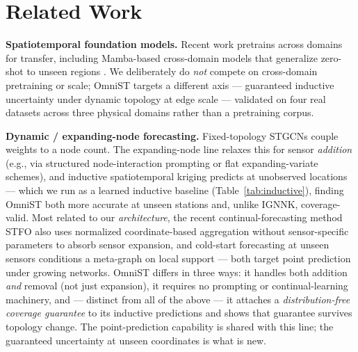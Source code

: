 \documentclass[journal]{IEEEtran}
\begin{document}
\section{Related Work}
\label{sec:related}

\textbf{Spatiotemporal foundation models.} Recent work pretrains across domains for transfer, including Mamba-based cross-domain models that generalize zero-shot to unseen regions \cite{dambast2026}. We deliberately do \emph{not} compete on cross-domain pretraining or scale; OmniST targets a different axis --- guaranteed inductive uncertainty under dynamic topology at edge scale --- validated on four real datasets across three physical domains rather than a pretraining corpus.

\textbf{Dynamic / expanding-node forecasting.} Fixed-topology STGCNs \cite{yu2018stgcn} couple weights to a node count. The expanding-node line relaxes this for sensor \emph{addition} (e.g., via structured node-interaction prompting or flat expanding-variate schemes), and inductive spatiotemporal kriging \cite{ignnk2020} predicts at unobserved locations --- which we run as a learned inductive baseline (Table~\ref{tab:inductive}), finding OmniST both more accurate at unseen stations and, unlike IGNNK, coverage-valid. Most related to our \emph{architecture}, the recent continual-forecasting method STFO \cite{stfo2026} also uses normalized coordinate-based aggregation without sensor-specific parameters to absorb sensor expansion, and cold-start forecasting at unseen sensors \cite{coldstart_unseen2026} conditions a meta-graph on local support --- both target point prediction under growing networks. OmniST differs in three ways: it handles both addition \emph{and} removal (not just expansion), it requires no prompting or continual-learning machinery, and --- distinct from all of the above --- it attaches a \emph{distribution-free coverage guarantee} to its inductive predictions and shows that guarantee survives topology change. The point-prediction capability is shared with this line; the guaranteed uncertainty at unseen coordinates is what is new.
\end{document}
